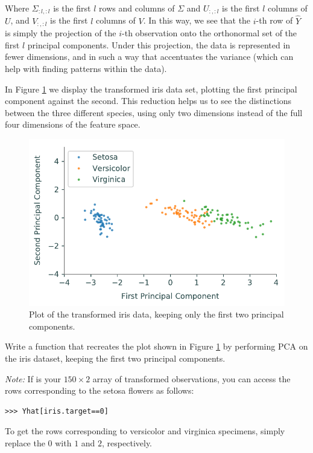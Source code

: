 Where $\Sigma_{:l,:l}$ is the first $l$ rows and columns of $\Sigma$ and $U_{:,:l}$ is the first $l$ columns of $U$, and $V_{:,:l}$ is the first $l$ columns of $V$. In this way, we see that the $i$-th row of $\widehat{Y}$ is simply the projection of the $i$-th observation onto the orthonormal set of the first $l$ principal components.
Under this projection, the data is represented in fewer dimensions, and in such a way that accentuates the variance (which can help with finding patterns within the data).

In Figure \ref{fig:iris_pca} we display the transformed iris data set, plotting the first principal component against the second. This reduction helps us to see the distinctions between the three different species, using only two dimensions instead of the full four dimensions of the feature space.
\begin{figure}[H]
\includegraphics[width=.7\textwidth]{figures/iris_pca.pdf}
\caption{Plot of the transformed iris data, keeping only the first two principal components.}
\label{fig:iris_pca}
\end{figure}

\begin{problem}
Write a function that recreates the plot shown in Figure \ref{fig:iris_pca} by performing PCA on the iris dataset, keeping the first two principal components.

\emph{Note:}
If  is your $150 \times 2$ array of transformed observations, you can access the rows corresponding to the setosa flowers as follows:
\begin{lstlisting}
>>> Yhat[iris.target==0]
\end{lstlisting}
To get the rows corresponding to versicolor and virginica specimens, simply replace the $0$ with $1$ and $2$, respectively.
\end{problem}

